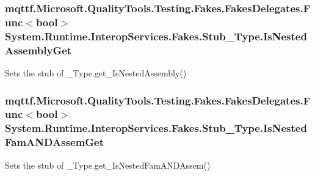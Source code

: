 \hypertarget{class_system_1_1_runtime_1_1_interop_services_1_1_fakes_1_1_stub___type_a5c7ad070b33dbe00362fd65c494221ce}{
\subsubsection[{Is\-Nested\-Assembly\-Get}]{\setlength{\rightskip}{0pt plus 5cm}mqttf.\-Microsoft.\-Quality\-Tools.\-Testing.\-Fakes.\-Fakes\-Delegates.\-Func$<$bool$>$ System.\-Runtime.\-Interop\-Services.\-Fakes.\-Stub\-\_\-\-Type.\-Is\-Nested\-Assembly\-Get}}\label{class_system_1_1_runtime_1_1_interop_services_1_1_fakes_1_1_stub___type_a5c7ad070b33dbe00362fd65c494221ce}


Sets the stub of \-\_\-\-Type.\-get\-\_\-\-Is\-Nested\-Assembly()

\hypertarget{class_system_1_1_runtime_1_1_interop_services_1_1_fakes_1_1_stub___type_a0ce4e29befb39b8030e8440eab024e3f}{
\subsubsection[{Is\-Nested\-Fam\-A\-N\-D\-Assem\-Get}]{\setlength{\rightskip}{0pt plus 5cm}mqttf.\-Microsoft.\-Quality\-Tools.\-Testing.\-Fakes.\-Fakes\-Delegates.\-Func$<$bool$>$ System.\-Runtime.\-Interop\-Services.\-Fakes.\-Stub\-\_\-\-Type.\-Is\-Nested\-Fam\-A\-N\-D\-Assem\-Get}}\label{class_system_1_1_runtime_1_1_interop_services_1_1_fakes_1_1_stub___type_a0ce4e29befb39b8030e8440eab024e3f}


Sets the stub of \-\_\-\-Type.\-get\-\_\-\-Is\-Nested\-Fam\-A\-N\-D\-Assem()


